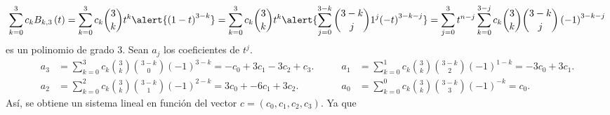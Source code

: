 \begin{frame}
\begin{solution}
        \begin{equation*}
            \sum_{k=0}^{3}
            c_{k}
            B_{k,3}\left(t\right)=
            \sum_{k=0}^{3}
            c_{k}
            \binom{3}{k}
            t^{k}
            \alert{
                {\left(1-t\right)}^{3-k}
            }=
            \sum_{k=0}^{3}
            c_{k}\binom{3}{k}t^k
            \alert{
                \sum_{j=0}^{3-k}
                \binom{3-k}{j}
                1^{j}
                    {\left(-t\right)}^{3-k-j}
            }=
            \sum_{j=0}^{3}
            t^{n-j}
            \sum_{k=0}^{3-j}
            c_{k}
            \binom{3}{k}
            \binom{3-k}{j}
            \left(-1\right)^{3-k-j}
        \end{equation*}
        es un polinomio de grado $3$.
        Sean $a_{j}$ los coeficientes de $t^{j}$.
        \begin{equation*}
            \begin{aligned}
                a_{3} & =
                \sum_{k=0}^{3}
                c_{k}
                \binom{3}{k}
                \binom{3-k}{0}
                {\left(-1\right)}^{3-k}=
                -c_{0}+3c_{1}-3c_{2}+c_{3}. \\
                a_{2} & =
                \sum_{k=0}^{2}
                c_{k}
                \binom{3}{k}
                \binom{3-k}{1}
                {\left(-1\right)}^{2-k}=
                3c_{0}+-6c_{1}+3c_{2}.
            \end{aligned}
            \qquad
            \begin{aligned}
                a_{1} & =
                \sum_{k=0}^{1}
                c_{k}
                \binom{3}{k}
                \binom{3-k}{2}
                {\left(-1\right)}^{1-k}=
                -3c_{0}+3c_{1}. \\
                a_{0} & =
                \sum_{k=0}^{0}
                c_{k}
                \binom{3}{k}
                \binom{3-k}{3}
                {\left(-1\right)}^{-k}=
                c_{0}.
            \end{aligned}
        \end{equation*}
        Así, se obtiene un sistema lineal en función del vector
        \begin{math}
            c=
            \left(
            c_{0},
            c_{1},
            c_{2},
            c_{3}
            \right)
        \end{math}.
        Ya que
        \begin{math}

\end{math}
\end{solution}
\end{frame}
